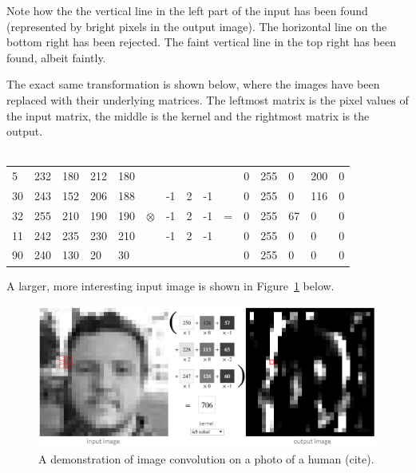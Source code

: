 Note how the the vertical line in the left part of the input has been found (represented by bright pixels in the output image). The horizontal line on the bottom right has been rejected. The faint vertical line in the top right has been found, albeit faintly.

The exact same transformation is shown below, where the images have been replaced with their underlying matrices. The leftmost matrix is the pixel values of the input matrix, the middle is the kernel and the rightmost matrix is the output. \\ \\

\begin{table}[h!]
	\centering
	\begin{tabular}{ p{0.5cm} p{0.5cm} p{0.5cm} p{0.5cm} p{0.5cm} p{0.5cm} p{0.5cm} p{0.5cm} p{0.5cm} p{0.5cm} p{0.5cm} p{0.5cm} p{0.5cm} p{0.5cm} p{0.5cm}}
 5 & 232 & 180 & 212 & 180 &           &    &   &    &   & 0 & 255 & 0 & 200 & 0 \\
30 & 243 & 152 & 206 & 188 &           & -1 & 2 & -1 &   & 0 & 255 & 0 & 116 & 0 \\
32 & 255 & 210 & 190 & 190 & $\otimes$ & -1 & 2 & -1 & = & 0 & 255 & 67 & 0  & 0 \\
11 & 242 & 235 & 230 & 210 &           & -1 & 2 & -1 &   & 0 & 255 & 0 &  0  & 0 \\
90 & 240 & 130 &  20 &  30 &           &    &   &    &   & 0 & 255 & 0 &  0  & 0
	\end{tabular}
\end{table}

A larger, more interesting input image is shown in Figure~\ref{fig:image_kernel_demo} below.

\begin{figure}[h!]
  \centering
  \includegraphics[width=\textwidth]{literature_review/image_kernel_demo}
  \caption{\label{fig:image_kernel_demo}A demonstration of image convolution on a photo of a human {\color{red} (cite)}.}
\end{figure}

